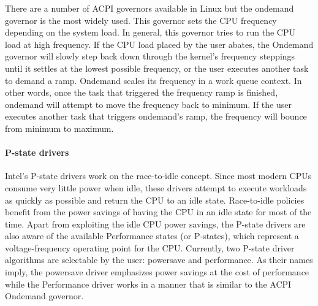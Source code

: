 There are a number of ACPI governors available in Linux but the ondemand governor is the most widely used.
This governor sets the CPU frequency depending on the system load.  
In general, this governor tries to run the CPU load at high frequency. If the CPU load placed by the user abates, the Ondemand governor will slowly 
step back down through the kernel's frequency steppings until it settles at the lowest possible frequency, or the user executes another task to demand a ramp.
Ondemand scales its frequency in a work queue context. In other words, once the task that triggered the frequency ramp is finished, 
ondemand will attempt to move the frequency back to minimum. If the user executes another task that triggers ondemand's ramp, the frequency will bounce from minimum to maximum.

\paragraph{P-state drivers}
Intel's P-state drivers work on the race-to-idle concept. Since most modern CPUs consume very little power when idle, these drivers attempt to execute workloads as quickly 
as possible and return the CPU to an idle state. Race-to-idle policies benefit from the power savings of having the CPU in an idle state for most of the time. Apart from 
exploiting the idle CPU power savings, the P-state drivers are also aware of the available Performance states (or P-states), which represent a voltage-frequency operating point for the CPU. 
Currently, two P-state driver algorithms are selectable by the user: powersave and performance. As their names imply, the powersave driver emphasizes power savings at the cost of 
performance while the Performance driver works in a manner that is similar to the ACPI Ondemand governor.
 
